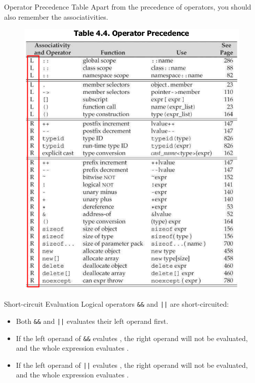 \documentclass[handout]{beamer}
\begin{document}
\begin{frame}{Operator Precedence Table}
    Apart from the precedence of operators, you should also remember the associativities.
    \begin{figure}[h]
        \centering
        \includegraphics[height=0.7\textheight]{figures/precedence.png}
    \end{figure}
\end{frame}

\begin{frame}{Short-circuit Evaluation}
    Logical operators \texttt{\&\&} and \texttt{||} are short-circuited:
    \begin{itemize}
        \item Both \texttt{\&\&} and \texttt{||} evaluates their left operand first.
        \item If the left operand of \texttt{\&\&} evalutes , the right operand will not be evaluated, and the whole expression evaluates .
        \item If the left operand of \texttt{||} evalutes , the right operand will not be evaluated, and the whole expression evaluates .
    \end{itemize}
\end{frame}
\end{document}
